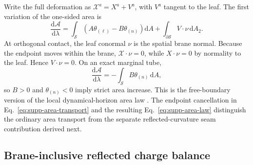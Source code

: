 \documentclass[11pt]{article}
\newcommand{\dd}{\mathrm{d}}
\begin{document}
Write the full deformation as $\mathcal X^a=X^a+V^a$, with $V^a$ tangent to
the leaf.  The first variation of the one-sided area is
\begin{equation}
\frac{\dd\mathcal A}{\dd\lambda}
=\int_{\mathcal S}
\left(A\theta_{(\ell)}-B\theta_{(n)}\right)\dd A
+\int_{\partial\mathcal S}V\mathbin\cdot\nu\,\dd A_2.
\label{eq:supp-area-transport}
\end{equation}
At orthogonal contact, the leaf conormal $\nu$ is the spatial brane normal.
Because the endpoint moves within the brane,
$\mathcal X\mathbin\cdot\nu=0$, while
$X\mathbin\cdot\nu=0$ by normality to the leaf.  Hence
$V\mathbin\cdot\nu=0$.  On an exact marginal tube,
\begin{equation}
\frac{\dd\mathcal A}{\dd\lambda}
=-\int_{\mathcal S}B\theta_{(n)}\,\dd A,
\label{eq:supp-area-law}
\end{equation}
so $B>0$ and $\theta_{(n)}<0$ imply strict area increase.  This is the
free-boundary version of the local dynamical-horizon area law
\cite{AshtekarKrishnan2002,AshtekarKrishnan2003}.  The endpoint cancellation
in Eq.~\eqref{eq:supp-area-transport} and the resulting
Eq.~\eqref{eq:supp-area-law} distinguish the ordinary area transport from the
separate reflected-curvature seam contribution derived next.

\subsection{Brane-inclusive reflected charge balance}
\end{document}
